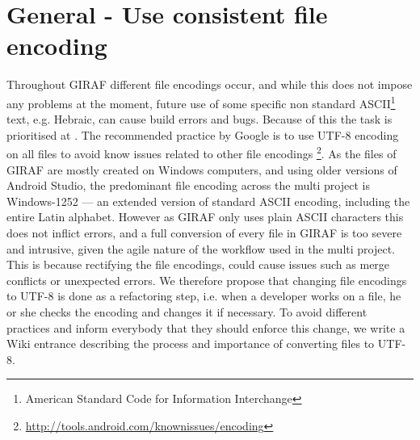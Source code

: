 \section{General - Use consistent file encoding}
Throughout GIRAF different file encodings occur, and while this does not impose any problems at the moment, future use of some specific non standard ASCII\footnote{American Standard Code for Information Interchange} text, e.g. Hebraic, can cause build errors and bugs.
Because of this the task is prioritised at \phigh.
The recommended practice by Google is to use UTF-8 encoding on all files to avoid know issues related to other file encodings \footnote{\url{http://tools.android.com/knownissues/encoding}}.
As the files of GIRAF are mostly created on Windows computers, and using older versions of Android Studio, the predominant file encoding across the multi project is Windows-1252 --- an extended version of standard ASCII encoding, including the entire Latin alphabet.
However as GIRAF only uses plain ASCII characters this does not inflict errors, and a full conversion of every file in GIRAF is too severe and intrusive, given the agile nature of the workflow used in the multi project.
This is because rectifying the file encodings, could cause issues such as merge conflicts or unexpected errors. 
We therefore propose that changing file encodings to UTF-8 is done as a refactoring step, i.e. when a developer works on a file, he or she checks the encoding and changes it if necessary.
To avoid different practices and inform everybody that they should enforce this change, we write a Wiki entrance describing the process and importance of converting files to UTF-8.
